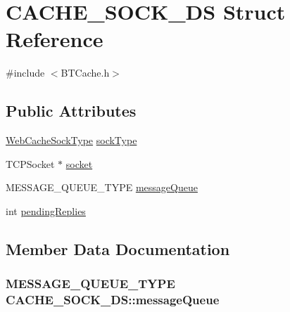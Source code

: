\hypertarget{structCACHE__SOCK__DS}{}\section{C\+A\+C\+H\+E\+\_\+\+S\+O\+C\+K\+\_\+\+D\+S Struct Reference}
\label{structCACHE__SOCK__DS}


{\ttfamily \#include $<$B\+T\+Cache.\+h$>$}

\subsection*{Public Attributes}
\begin{DoxyCompactItemize}
\item 
\hyperlink{BTCache_8h_ac869adb93ddd200a3d13c12e2ed5b247}{Web\+Cache\+Sock\+Type} \hyperlink{structCACHE__SOCK__DS_aeb66061fd835019d9aa685d288b05fab}{sock\+Type}
\item 
T\+C\+P\+Socket $\ast$ \hyperlink{structCACHE__SOCK__DS_a8b7dc6785db9ec4180a39a1f912704ea}{socket}
\item 
M\+E\+S\+S\+A\+G\+E\+\_\+\+Q\+U\+E\+U\+E\+\_\+\+T\+Y\+P\+E \hyperlink{structCACHE__SOCK__DS_aec59e01835f74e4545535f9e943175e3}{message\+Queue}
\item 
int \hyperlink{structCACHE__SOCK__DS_a81e09cc8c39d46511f416537f0059905}{pending\+Replies}
\end{DoxyCompactItemize}


\subsection{Member Data Documentation}
\hypertarget{structCACHE__SOCK__DS_aec59e01835f74e4545535f9e943175e3}{}
\subsubsection[{message\+Queue}]{\setlength{\rightskip}{0pt plus 5cm}M\+E\+S\+S\+A\+G\+E\+\_\+\+Q\+U\+E\+U\+E\+\_\+\+T\+Y\+P\+E C\+A\+C\+H\+E\+\_\+\+S\+O\+C\+K\+\_\+\+D\+S\+::message\+Queue}\label{structCACHE__SOCK__DS_aec59e01835f74e4545535f9e943175e3}
\hypertarget{structCACHE__SOCK__DS_a81e09cc8c39d46511f416537f0059905}{}
